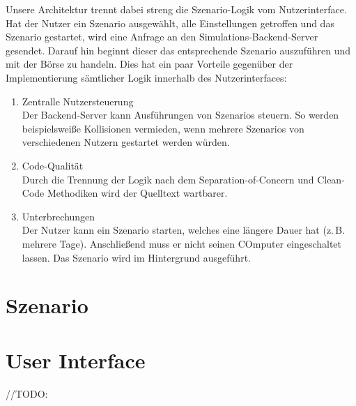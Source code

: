 Unsere Architektur trennt dabei streng die Szenario-Logik vom Nutzerinterface.
Hat der Nutzer ein Szenario ausgewählt, alle Einstellungen getroffen und das Szenario gestartet, wird eine Anfrage an den Simulations-Backend-Server gesendet. Darauf hin beginnt dieser das entsprechende Szenario auszuführen und mit der Börse zu handeln.
Dies hat ein paar Vorteile gegenüber der Implementierung sämtlicher Logik innerhalb des Nutzerinterfaces:
\begin{enumerate}
    \item Zentralle Nutzersteuerung\\
        Der Backend-Server kann Ausführungen von Szenarios steuern. So werden beispielsweiße Kollisionen vermieden, wenn mehrere Szenarios von verschiedenen Nutzern gestartet werden würden.
    \item Code-Qualität\\
        Durch die Trennung der Logik nach dem Separation-of-Concern und Clean-Code Methodiken wird der Quelltext wartbarer.
    \item Unterbrechungen\\
        Der Nutzer kann ein Szenario starten, welches eine längere Dauer hat (z.\,B. mehrere Tage). Anschließend muss er nicht seinen COmputer eingeschaltet lassen. Das Szenario wird im Hintergrund ausgeführt.
\end{enumerate}

\section{Szenario}

\section{User Interface}
//TODO:

